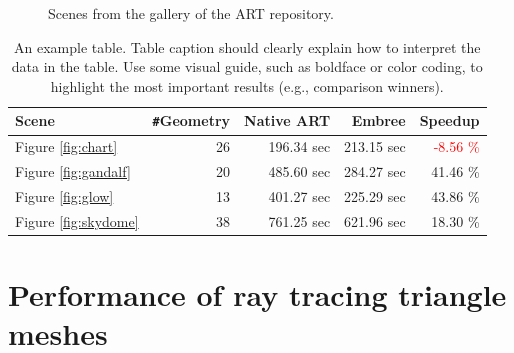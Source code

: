 \begin{figure}
	
	\caption{Scenes from the gallery of the ART repository.}
	\label{fig:scenes}
\end{figure}


\begin{table}
	\centering
	{\footnotesize\sf
		\begin{tabular}{lrrrr}
			\toprule
			Scene & \Verb!#!Geometry & Native ART & Embree & Speedup \\ 
			\midrule
			Figure \ref{fig:chart} & 26 & 196.34 sec & 213.15 sec & \textcolor{red}{-8.56 \%} \\
			Figure \ref{fig:gandalf} & 20 & 485.60 sec & 284.27 sec & 41.46 \% \\
			Figure \ref{fig:glow} & 13 & 401.27 sec & 225.29 sec & 43.86 \%  \\
			Figure \ref{fig:skydome} & 38 & 761.25 sec & 621.96 sec & 18.30 \% \\
			\bottomrule
	\end{tabular}}
	\caption{An example table. Table caption should clearly explain how to interpret the data in the table. Use some visual guide, such as boldface or color coding, to highlight the most important results (e.g., comparison winners).}
	\label{tab:scenes}
\end{table}


\section{Performance of ray tracing triangle meshes}
\label{sec:result_meshes}

